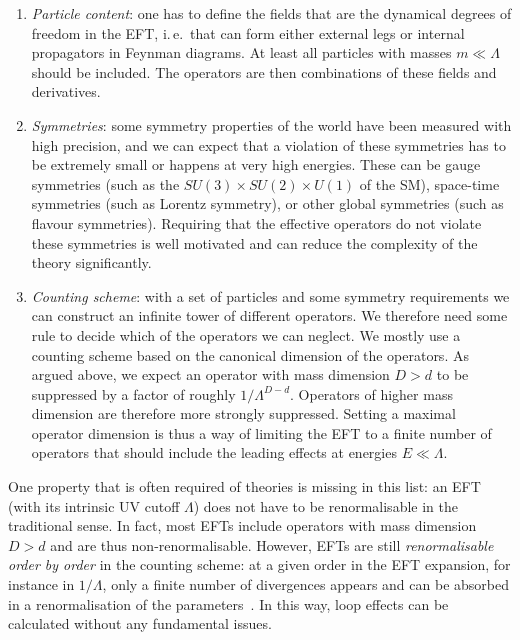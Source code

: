\begin{enumerate}
\item \emph{Particle content}: one has to define the fields that are
  the dynamical degrees of freedom in the EFT, i.\,e.\ that can form
  either external legs or internal propagators in Feynman diagrams. At
  least all particles with masses $m \ll \Lambda$ should be
  included. The operators are then combinations of these fields and
  derivatives.
%
\item \emph{Symmetries}: some symmetry properties of the world have
  been measured with high precision, and we can expect that a
  violation of these symmetries has to be extremely small or happens
  at very high energies. These can be gauge symmetries (such as the
  $SU(3) \times SU(2) \times U(1)$ of the SM), space-time symmetries
  (such as Lorentz symmetry), or other global symmetries (such as
  flavour symmetries). Requiring that the effective operators do not
  violate these symmetries is well motivated and can reduce the
  complexity of the theory significantly.
%
\item \emph{Counting scheme}: with a set of particles and some
  symmetry requirements we can construct an infinite tower of
  different operators. We therefore need some rule to decide which of
  the operators we can neglect. We mostly use a counting scheme based
  on the canonical dimension of the operators. As argued above, we
  expect an operator with mass dimension $D > d$ to be suppressed by a
  factor of roughly $1 / \Lambda^{D-d}$. Operators of higher mass
  dimension are therefore more strongly suppressed. Setting a maximal
  operator dimension is thus a way of limiting the EFT to a finite
  number of operators that should include the leading effects at
  energies $E \ll \Lambda$.
\end{enumerate}

One property that is often required of theories is missing in this
list: an EFT (with its intrinsic UV cutoff $\Lambda$) does not have to
be renormalisable in the traditional sense. In fact, most EFTs include
operators with mass dimension $D > d$ and are thus non-renormalisable.
However, EFTs are still \emph{renormalisable order by order} in the
counting scheme: at a given order in the EFT expansion, for instance
in $1/\Lambda$, only a finite number of divergences appears and can
be absorbed in a renormalisation of the
parameters~\cite{Wudka:1994ny}. In this way, loop effects can be
calculated without any fundamental issues.



